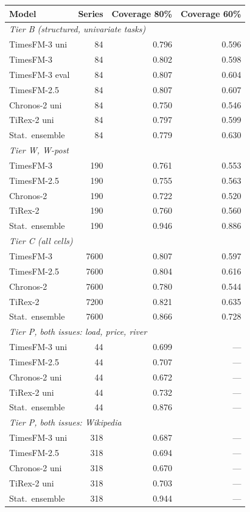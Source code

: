\begin{tabular}{lrrr}
\toprule
Model & Series & Coverage 80\% & Coverage 60\% \\
\midrule
\multicolumn{4}{l}{\textit{Tier B (structured, univariate tasks)}} \\
TimesFM-3 uni & 84 & 0.796 & 0.596 \\
TimesFM-3 & 84 & 0.802 & 0.598 \\
TimesFM-3 eval & 84 & 0.807 & 0.604 \\
TimesFM-2.5 & 84 & 0.807 & 0.607 \\
Chronos-2 uni & 84 & 0.750 & 0.546 \\
TiRex-2 uni & 84 & 0.797 & 0.599 \\
Stat.\ ensemble & 84 & 0.779 & 0.630 \\
\multicolumn{4}{l}{\textit{Tier W, W-post}} \\
TimesFM-3 & 190 & 0.761 & 0.553 \\
TimesFM-2.5 & 190 & 0.755 & 0.563 \\
Chronos-2 & 190 & 0.722 & 0.520 \\
TiRex-2 & 190 & 0.760 & 0.560 \\
Stat.\ ensemble & 190 & 0.946 & 0.886 \\
\multicolumn{4}{l}{\textit{Tier C (all cells)}} \\
TimesFM-3 & 7600 & 0.807 & 0.597 \\
TimesFM-2.5 & 7600 & 0.804 & 0.616 \\
Chronos-2 & 7600 & 0.780 & 0.544 \\
TiRex-2 & 7200 & 0.821 & 0.635 \\
Stat.\ ensemble & 7600 & 0.866 & 0.728 \\
\multicolumn{4}{l}{\textit{Tier P, both issues: load, price, river}} \\
TimesFM-3 uni & 44 & 0.699 & --- \\
TimesFM-2.5 & 44 & 0.707 & --- \\
Chronos-2 uni & 44 & 0.672 & --- \\
TiRex-2 uni & 44 & 0.732 & --- \\
Stat.\ ensemble & 44 & 0.876 & --- \\
\multicolumn{4}{l}{\textit{Tier P, both issues: Wikipedia}} \\
TimesFM-3 uni & 318 & 0.687 & --- \\
TimesFM-2.5 & 318 & 0.694 & --- \\
Chronos-2 uni & 318 & 0.670 & --- \\
TiRex-2 uni & 318 & 0.703 & --- \\
Stat.\ ensemble & 318 & 0.944 & --- \\
\bottomrule
\end{tabular}

